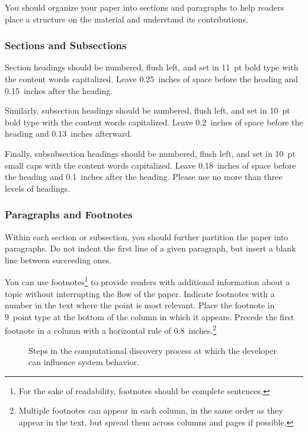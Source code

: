 You should organize your paper into sections and paragraphs to help 
readers place a structure on the material and understand its contributions. 

\vspace{-0.018in}
\subsubsection{Sections and Subsections}
\vspace{-0.015in}

Section headings should be numbered, flush left, and set in 11~pt bold
type with the content words capitalized. Leave 0.25~inches of space 
before the heading and 0.15~inches after the heading. 

Similarly, subsection headings should be numbered, flush left, and set
in 10~pt bold type with the content words capitalized. Leave 0.2~inches 
of space before the heading and 0.13~inches afterward.

Finally, subsubsection headings should be numbered, flush left, and set
in 10~pt small caps with the content words capitalized. Leave 0.18~inches 
of space before the heading and 0.1~inches after the heading. Please 
use no more than three levels of headings.

\subsubsection{Paragraphs and Footnotes}

Within each section or subsection, you should further partition the
paper into paragraphs. Do not indent the first line of a given
paragraph, but insert a blank line between succeeding ones.
 
You can use footnotes\footnote{For the sake of readability, footnotes
should be complete sentences.} to provide readers with additional
information about a topic without interrupting the flow of the paper.
Indicate footnotes with a number in the text where the point is most
relevant. Place the footnote in 9~point type at the bottom of the
column in which it appears. Precede the first footnote in a column 
with a horizontal rule of 0.8~inches.\footnote{Multiple footnotes can
appear in each column, in the same order as they appear in the text,
but spread them across columns and pages if possible.}

\begin{figure}[h]
\vskip 0.2in
\begin{center}
\setlength{\epsfxsize}{3.25in}
\centerline{}
\caption{Steps in the computational discovery process at which the
         developer can influence system behavior.}
\label{process-flow}
\end{center}
\vskip -0.2in
\end{figure} 

